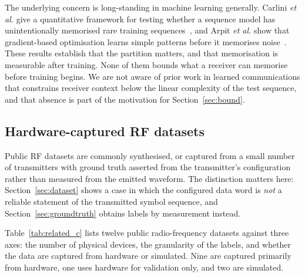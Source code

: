 \documentclass[journal]{IEEEtran}   %
\begin{document}
The underlying concern is long-standing in machine learning generally. Carlini
\textit{et al.} give a quantitative framework for testing whether a sequence
model has unintentionally memorised rare training
sequences~\cite{nicolas2019secretSharer}, and Arpit \textit{et al.} show that
gradient-based optimisation learns simple patterns before it memorises
noise~\cite{arpit2017memorizationinDL}. These results establish that the
partition matters, and that memorisation is measurable after training. None of
them bounds what a receiver can memorise before training begins. We are not
aware of prior work in learned communications that constrains receiver context
below the linear complexity of the test sequence, and that absence is part of
the motivation for Section~\ref{sec:bound}.

\subsection{Hardware-captured RF datasets}
Public RF datasets are commonly synthesised, or captured from a small number of
transmitters with ground truth asserted from the transmitter's configuration
rather than measured from the emitted waveform. The distinction matters here:
Section~\ref{sec:dataset} shows a case in which the configured data word is
\emph{not} a reliable statement of the transmitted symbol sequence, and
Section~\ref{sec:groundtruth} obtains labels by measurement instead.

Table~\ref{tab:related_c} lists twelve public radio-frequency datasets against
three axes: the number of physical devices, the granularity of the labels, and
whether the data are captured from hardware or simulated. Nine are captured
primarily from hardware, one uses hardware for validation only, and two are
simulated.
\end{document}
